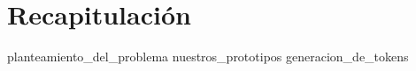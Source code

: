 %
%
%

\section{Recapitulación}

{planteamiento_del_problema}
{nuestros_prototipos}
{generacion_de_tokens}
